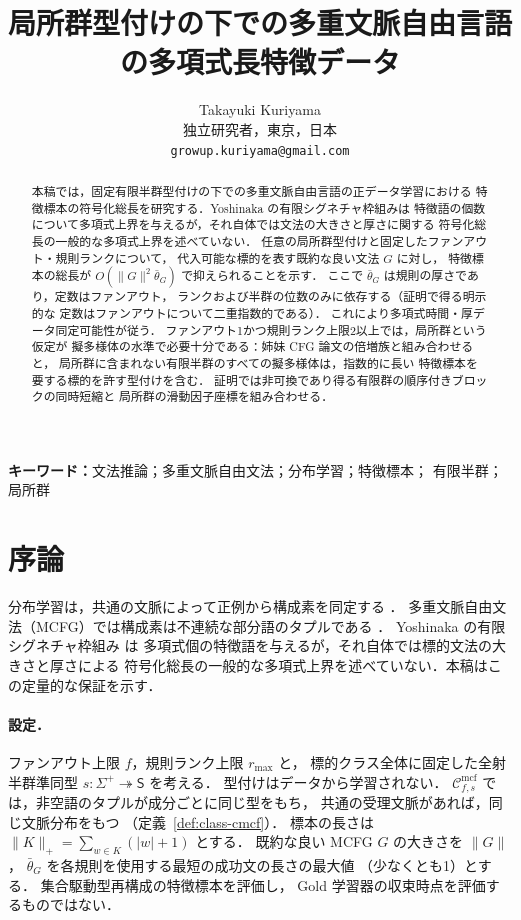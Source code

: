 \documentclass[11pt,a4paper]{ltjsarticle}
\title{局所群型付けの下での多重文脈自由言語の多項式長特徴データ}
\author{Takayuki Kuriyama\\
独立研究者，東京，日本\\
\texttt{growup.kuriyama@gmail.com}}
\date{}
\numberwithin{equation}{section}
\theoremstyle{plain}
\theoremstyle{definition}
\theoremstyle{remark}
\newcommand{\Cmcf}[2]{\mathcal{C}^{\mathrm{mcf}}_{#1,#2}}
\theoremstyle{plain}
\begin{document}
\maketitle

\begin{abstract}
本稿では，固定有限半群型付けの下での多重文脈自由言語の正データ学習における
特徴標本の符号化総長を研究する．Yoshinaka の有限シグネチャ枠組みは
特徴語の個数について多項式上界を与えるが，それ自体では文法の大きさと厚さに関する
符号化総長の一般的な多項式上界を述べていない．
任意の局所群型付けと固定したファンアウト・規則ランクについて，
代入可能な標的を表す既約な良い文法 $G$ に対し，
特徴標本の総長が $O(\|G\|^2\bar\theta_G)$ で抑えられることを示す．
ここで $\bar\theta_G$ は規則の厚さであり，定数はファンアウト，
ランクおよび半群の位数のみに依存する（証明で得る明示的な
定数はファンアウトについて二重指数的である）．
これにより多項式時間・厚データ同定可能性が従う．
ファンアウト1かつ規則ランク上限2以上では，局所群という仮定が
擬多様体の水準で必要十分である：姉妹 CFG 論文の倍増族と組み合わせると，
局所群に含まれない有限半群のすべての擬多様体は，指数的に長い
特徴標本を要する標的を許す型付けを含む．
証明では非可換であり得る有限群の順序付きブロックの同時短縮と
局所群の滑動因子座標を組み合わせる．
\end{abstract}

\noindent\textbf{キーワード：}文法推論；多重文脈自由文法；分布学習；特徴標本；
有限半群；局所群
\par\medskip

\section{序論}
\label{sec:introduction}
分布学習は，共通の文脈によって正例から構成素を同定する
\cite{Gold1967,Angluin1980,ClarkEyraud2007}．
多重文脈自由文法（MCFG）では構成素は不連続な部分語のタプルである
\cite{SekiEtAl1991,Yoshinaka2009,Yoshinaka2011}．
Yoshinaka の有限シグネチャ枠組み
\cite[Theorem~1 and Lemmas~2--3]{Yoshinaka2015General} は
多項式個の特徴語を与えるが，それ自体では標的文法の大きさと厚さによる
符号化総長の一般的な多項式上界を述べていない．本稿はこの定量的な保証を示す．

\paragraph{設定．}
ファンアウト上限 $f$，規則ランク上限 $r_{\max}$ と，
標的クラス全体に固定した全射半群準同型
$s:\Sigma^+\twoheadrightarrow\mathsf S$ を考える．
型付けはデータから学習されない．
$\Cmcf{f}{s}$ では，非空語のタプルが成分ごとに同じ型をもち，
共通の受理文脈があれば，同じ文脈分布をもつ
（定義~\ref{def:class-cmcf}）．
標本の長さは $\|K\|_+=\sum_{w\in K}(|w|+1)$ とする．
既約な良い MCFG $G$ の大きさを $\|G\|$，
$\bar\theta_G$ を各規則を使用する最短の成功文の長さの最大値
（少なくとも1）とする．
集合駆動型再構成の特徴標本を評価し，
Gold 学習器の収束時点を評価するものではない．
\end{document}
